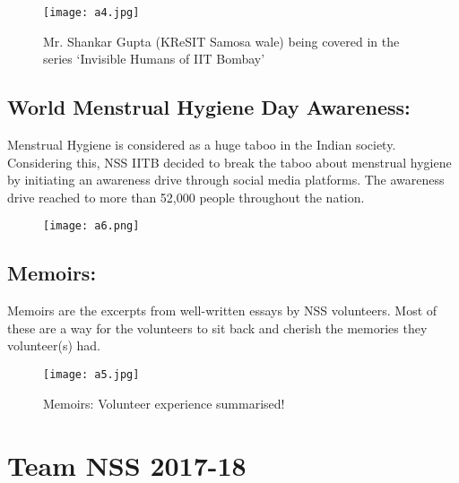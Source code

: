 \begin{figure}[H]
\centering
\texttt{[image: a4.jpg]}
\caption*{Mr. Shankar Gupta (KReSIT Samosa wale) being covered in the series ‘Invisible Humans of IIT Bombay’
}
\end{figure}

\section*{World Menstrual Hygiene Day Awareness: }Menstrual Hygiene is considered as a huge taboo in the Indian society. Considering this, NSS IITB decided to break the taboo about menstrual hygiene by initiating an awareness drive through social media platforms. The awareness drive reached to more than 52,000 people throughout the nation.

\begin{figure}[H]
\centering
\texttt{[image: a6.png]}
\end{figure}

\section*{Memoirs: } Memoirs are the excerpts from well-written essays by NSS volunteers. Most of these are a way for the volunteers to sit back and cherish the memories they volunteer(s) had.

\begin{figure}[H]
\centering
\texttt{[image: a5.jpg]}
\caption*{Memoirs: Volunteer experience summarised!}
\end{figure}



\chapter*{Team NSS 2017-18}

\vspace*{0.8cm}

